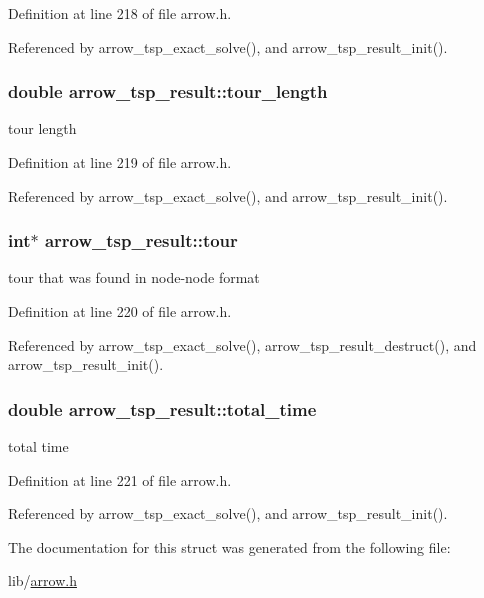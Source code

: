 Definition at line 218 of file arrow.h.

Referenced by arrow\_\-tsp\_\-exact\_\-solve(), and arrow\_\-tsp\_\-result\_\-init().\hypertarget{structarrow__tsp__result_93a335ce86270dd455185d22ea5fd4ab}{
\subsubsection{\setlength{\rightskip}{0pt plus 5cm}double {\bf arrow\_\-tsp\_\-result::tour\_\-length}}}
\label{structarrow__tsp__result_93a335ce86270dd455185d22ea5fd4ab}


tour length 

Definition at line 219 of file arrow.h.

Referenced by arrow\_\-tsp\_\-exact\_\-solve(), and arrow\_\-tsp\_\-result\_\-init().\hypertarget{structarrow__tsp__result_48433b03146d6ca3423a555ea2139d52}{
\subsubsection{\setlength{\rightskip}{0pt plus 5cm}int$\ast$ {\bf arrow\_\-tsp\_\-result::tour}}}
\label{structarrow__tsp__result_48433b03146d6ca3423a555ea2139d52}


tour that was found in node-node format 

Definition at line 220 of file arrow.h.

Referenced by arrow\_\-tsp\_\-exact\_\-solve(), arrow\_\-tsp\_\-result\_\-destruct(), and arrow\_\-tsp\_\-result\_\-init().\hypertarget{structarrow__tsp__result_82ea7aa0320d932892602d34339a9276}{
\subsubsection{\setlength{\rightskip}{0pt plus 5cm}double {\bf arrow\_\-tsp\_\-result::total\_\-time}}}
\label{structarrow__tsp__result_82ea7aa0320d932892602d34339a9276}


total time 

Definition at line 221 of file arrow.h.

Referenced by arrow\_\-tsp\_\-exact\_\-solve(), and arrow\_\-tsp\_\-result\_\-init().

The documentation for this struct was generated from the following file:\begin{CompactItemize}
\item 
lib/\hyperlink{arrow_8h}{arrow.h}\end{CompactItemize}
